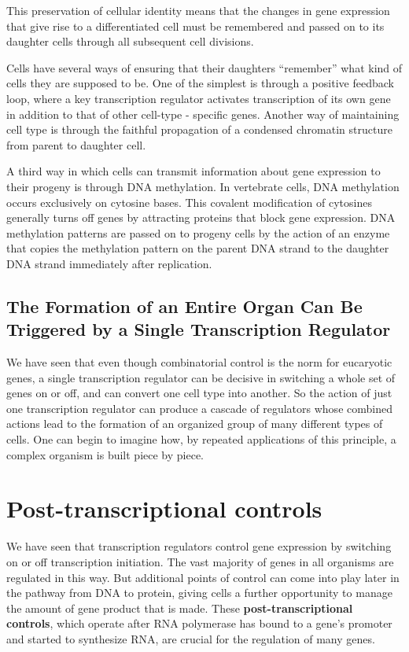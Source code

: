 This preservation of cellular identity means that the changes in gene
expression that give rise to a differentiated cell must be remembered and
passed on to its daughter cells through all subsequent cell divisions.

Cells have several ways of ensuring that their daughters “remember”
what kind of cells they are supposed to be. One of the simplest is through
a positive feedback loop, where a key transcription regulator activates
transcription of its own gene in addition to that of other cell-type - specific
genes. Another way of maintaining cell type is through
the faithful propagation of a condensed chromatin structure from parent
to daughter cell.

A third way in which cells can transmit information about gene expression
to their progeny is through DNA methylation. In vertebrate cells,
DNA methylation occurs exclusively on cytosine bases. This
covalent modification of cytosines generally turns off genes by attracting
proteins that block gene expression. DNA methylation patterns are
passed on to progeny cells by the action of an enzyme that copies the
methylation pattern on the parent DNA strand to the daughter DNA strand
immediately after replication.

\subsection{The Formation of an Entire Organ Can Be Triggered by a Single Transcription Regulator}

We have seen that even though combinatorial control is the norm for
eucaryotic genes, a single transcription regulator can be decisive in
switching a whole set of genes on or off, and can convert one cell type
into another. So the action of just one transcription regulator
can produce a cascade of regulators whose combined actions lead
to the formation of an organized group of many different types of cells.
One can begin to imagine how, by repeated applications of this principle,
a complex organism is built piece by piece.

\section{Post-transcriptional controls}

We have seen that transcription regulators control gene expression by
switching on or off transcription initiation. The vast majority of genes
in all organisms are regulated in this way. But additional points of control
can come into play later in the pathway from DNA to protein, giving
cells a further opportunity to manage the amount of gene product that
is made. These \textbf{post-transcriptional controls}, which operate after RNA
polymerase has bound to a gene’s promoter and started to synthesize
RNA, are crucial for the regulation of many genes.

